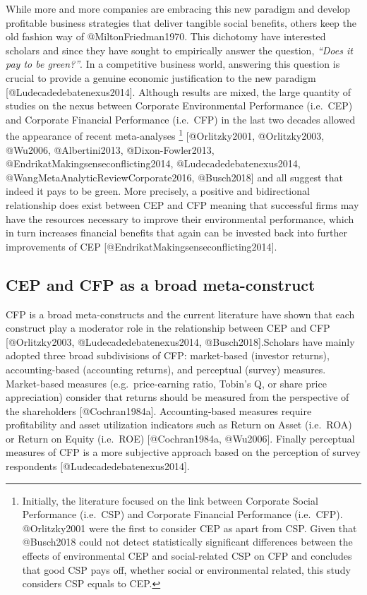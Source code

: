 \documentclass[]{article}
\let\rmarkdownfootnote\footnote%
\def\footnote{\protect\rmarkdownfootnote}
\begin{document}
While more and more companies are embracing this new paradigm and
develop profitable business strategies that deliver tangible social
benefits, others keep the old fashion way of @MiltonFriedman1970. This
dichotomy have interested scholars and since they have sought to
empirically answer the question, \emph{``Does it pay to be green?''}. In
a competitive business world, answering this question is crucial to
provide a genuine economic justification to the new paradigm
{[}@Ludecadedebatenexus2014{]}. Although results are mixed, the large
quantity of studies on the nexus between Corporate Environmental
Performance (i.e.~CEP) and Corporate Financial Performance (i.e.~CFP) in
the last two decades allowed the appearance of recent meta-analyses
\footnote{Initially, the literature focused on the link between
  Corporate Social Performance (i.e.~CSP) and Corporate Financial
  Performance (i.e.~CFP). @Orlitzky2001 were the first to consider CEP
  as apart from CSP. Given that @Busch2018 could not detect
  statistically significant differences between the effects of
  environmental CEP and social-related CSP on CFP and concludes that
  good CSP pays off, whether social or environmental related, this study
  considers CSP equals to CEP.} {[}@Orlitzky2001, @Orlitzky2003,
@Wu2006, @Albertini2013, @Dixon-Fowler2013,
@EndrikatMakingsenseconflicting2014, @Ludecadedebatenexus2014,
@WangMetaAnalyticReviewCorporate2016, @Busch2018{]} and all suggest that
indeed it pays to be green. More precisely, a positive and bidirectional
relationship does exist between CEP and CFP meaning that successful
firms may have the resources necessary to improve their environmental
performance, which in turn increases financial benefits that again can
be invested back into further improvements of CEP
{[}@EndrikatMakingsenseconflicting2014{]}.

\subsection{CEP and CFP as a broad
meta-construct}\label{cep-and-cfp-as-a-broad-meta-construct}

CFP is a broad meta-constructs and the current literature have shown
that each construct play a moderator role in the relationship between
CEP and CFP {[}@Orlitzky2003, @Ludecadedebatenexus2014,
@Busch2018{]}.Scholars have mainly adopted three broad subdivisions of
CFP: market-based (investor returns), accounting-based (accounting
returns), and perceptual (survey) measures. Market-based measures
(e.g.~price-earning ratio, Tobin's Q, or share price appreciation)
consider that returns should be measured from the perspective of the
shareholders {[}@Cochran1984a{]}. Accounting-based measures require
profitability and asset utilization indicators such as Return on Asset
(i.e.~ROA) or Return on Equity (i.e.~ROE) {[}@Cochran1984a, @Wu2006{]}.
Finally perceptual measures of CFP is a more subjective approach based
on the perception of survey respondents {[}@Ludecadedebatenexus2014{]}.
\end{document}
